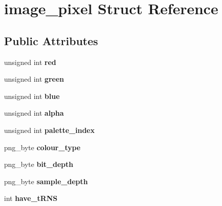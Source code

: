 \hypertarget{structimage__pixel}{\section{image\+\_\+pixel Struct Reference}
\label{structimage__pixel}
}
\subsection*{Public Attributes}
\begin{DoxyCompactItemize}
\item 
\hypertarget{structimage__pixel_a9a483d62e93f5090ced81d02932fedfd}{unsigned int {\bfseries red}}\label{structimage__pixel_a9a483d62e93f5090ced81d02932fedfd}

\item 
\hypertarget{structimage__pixel_a134eed972681b927dd1ea9afb608849a}{unsigned int {\bfseries green}}\label{structimage__pixel_a134eed972681b927dd1ea9afb608849a}

\item 
\hypertarget{structimage__pixel_a39c70f034787aaf58fcd6db583ed0dc3}{unsigned int {\bfseries blue}}\label{structimage__pixel_a39c70f034787aaf58fcd6db583ed0dc3}

\item 
\hypertarget{structimage__pixel_a3c1553190085f59701d7848e19a43745}{unsigned int {\bfseries alpha}}\label{structimage__pixel_a3c1553190085f59701d7848e19a43745}

\item 
\hypertarget{structimage__pixel_ac87123d11cbbcd6e6b70bb09509d3587}{unsigned int {\bfseries palette\+\_\+index}}\label{structimage__pixel_ac87123d11cbbcd6e6b70bb09509d3587}

\item 
\hypertarget{structimage__pixel_a5a8cb814d91f61030bab6ea9a683e233}{png\+\_\+byte {\bfseries colour\+\_\+type}}\label{structimage__pixel_a5a8cb814d91f61030bab6ea9a683e233}

\item 
\hypertarget{structimage__pixel_a1e12bd9ef1bd0a0eea041aaffd4b47f3}{png\+\_\+byte {\bfseries bit\+\_\+depth}}\label{structimage__pixel_a1e12bd9ef1bd0a0eea041aaffd4b47f3}

\item 
\hypertarget{structimage__pixel_ab30bed81e70b5cdbad1d0b14a1d88cff}{png\+\_\+byte {\bfseries sample\+\_\+depth}}\label{structimage__pixel_ab30bed81e70b5cdbad1d0b14a1d88cff}

\item 
\hypertarget{structimage__pixel_a814bd47c5eee3473f4194e6a74d95500}{int {\bfseries have\+\_\+t\+R\+N\+S}}\label{structimage__pixel_a814bd47c5eee3473f4194e6a74d95500}


\end{DoxyCompactItemize}
